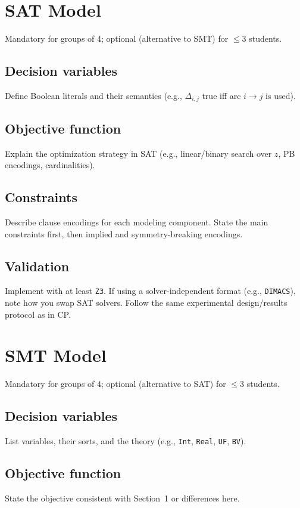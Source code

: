 \documentclass{article}
\begin{document}
\section{SAT Model}
Mandatory for groups of 4; optional (alternative to SMT) for \(\le 3\) students.

\subsection{Decision variables}
Define Boolean literals and their semantics (e.g., $\Delta_{i,j}$ true iff arc $i\!\to\! j$ is used).

\subsection{Objective function}
Explain the optimization strategy in SAT (e.g., linear/binary search over $z$, PB encodings, cardinalities).

\subsection{Constraints}
Describe clause encodings for each modeling component.
State the main constraints first, then implied and symmetry-breaking encodings.

\subsection{Validation}
Implement with at least \texttt{Z3}. If using a solver-independent format (e.g., \texttt{DIMACS}), note how you swap SAT solvers.
Follow the same experimental design/results protocol as in CP.

\section{SMT Model}
Mandatory for groups of 4; optional (alternative to SAT) for \(\le 3\) students.

\subsection{Decision variables}
List variables, their sorts, and the theory (e.g., \texttt{Int}, \texttt{Real}, \texttt{UF}, \texttt{BV}).

\subsection{Objective function}
State the objective consistent with Section~1 or differences here.
\end{document}
